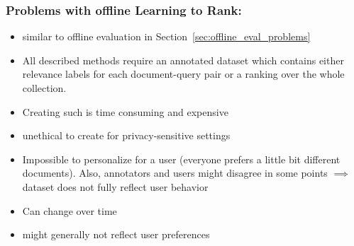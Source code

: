 \subsubsection{Problems with offline Learning to Rank:}
\begin{itemize}
	\item similar to offline evaluation in Section~\ref{sec:offline_eval_problems}
	\item All described methods require an annotated dataset which contains either relevance labels for each document-query pair or a ranking over the whole collection.
	\item Creating such is time consuming and expensive
	\item unethical to create for privacy-sensitive settings
	\item Impossible to personalize for a user (everyone prefers a little bit different documents). Also, annotators and users might disagree in some points $\implies$ dataset does not fully reflect user behavior
	\item Can change over time
	\item might generally not reflect user preferences
\end{itemize}
